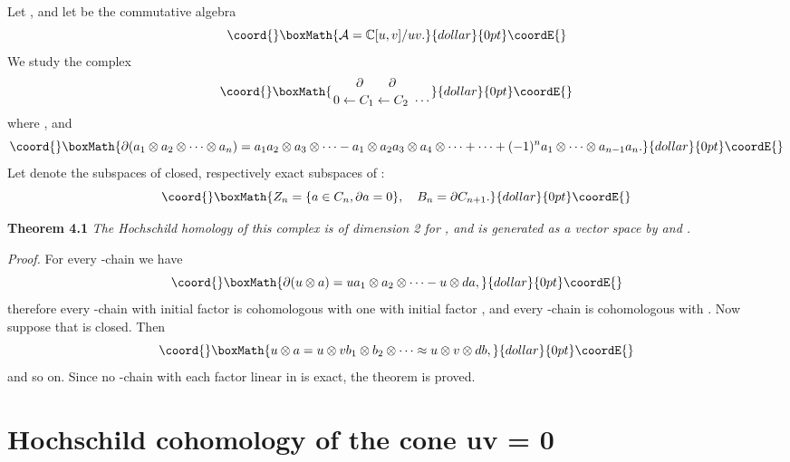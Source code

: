 \documentclass[a4paper,a4paper]{article}
\begin{document}
Let \coordHE{}, and let 
\coordHE{} be the commutative algebra
$$\coord{}\boxMath{
{\mathcal{A}} = \mathbb{C}[u,v]/uv.
}{dollar}{0pt}\coordE{}$$
We study the complex 
$$\coord{}\boxMath{
{{\hskip-3mm\partial\hskip7mm\partial}\atop 
{0\leftarrow C_1 \leftarrow C_2\,\,\cdots}}
}{dollar}{0pt}\coordE{}$$
where \coordHE{}, and
$$\coord{}\boxMath{
\partial(a_1\otimes a_2\otimes \cdots \otimes a_n) = a_1a_2\otimes
a_3\otimes \cdots - a_1\otimes a_2a_3\otimes a_4\otimes \cdots +
\cdots +
(-1)^n a_1\otimes \cdots \otimes a_{n-1}a_n.
}{dollar}{0pt}\coordE{}$$
Let \coordHE{} denote the subspaces of closed, respectively exact
subspaces of \coordHE{}:
$$\coord{}\boxMath{
Z_n = \{ a\in C_n, \partial a = 0\},\quad B_n = \partial C_{n+1}.
}{dollar}{0pt}\coordE{}$$

\noindent\textbf{Theorem 4.1} \textit{
The  Hochschild homology \coordHE{}
of this complex is of dimension 2 for \coordHE{}, and is generated as a
vector space by \coordHE{} and \coordHE{}.}

\noindent\textit{Proof.} For every \coordHE{}-chain \coordHE{} we have
$$\coord{}\boxMath{
\partial(u\otimes a) = ua_1\otimes a_2 \otimes \cdots - u\otimes da,
}{dollar}{0pt}\coordE{}$$
therefore every \coordHE{}-chain with initial factor \coordHE{} is cohomologous
with one with initial factor \coordHE{}, and every \coordHE{}-chain is cohomologous
with \coordHE{}. Now suppose that \coordHE{} is closed. Then
$$\coord{}\boxMath{
u\otimes a = u\otimes vb_1\otimes b_2 \otimes \cdots \approx  u 
\otimes v\otimes db,
}{dollar}{0pt}\coordE{}$$
and so on. Since no \coordHE{}-chain \coordHE{} with each factor \coordHE{} linear in
\coordHE{} is exact, the theorem is proved. \hfill \myHighlight{$\Box$}\coordHE{}


\section{Hochschild cohomology of the cone uv = 0} %
\end{document}
